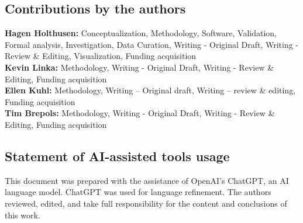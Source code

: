 \subsection{Contributions by the authors}
%
\textbf{Hagen Holthusen:} Conceptualization, Methodology, Software, Validation, Formal analysis, Investigation, Data Curation, Writing - Original Draft, Writing - Review \& Editing, Visualization, Funding acquisition\\
\textbf{Kevin Linka:} Methodology, Writing - Original Draft, Writing - Review \& Editing, Funding acquisition\\
\textbf{Ellen Kuhl:} Methodology, Writing – Original draft, Writing – review \& editing, Funding acquisition\\
\textbf{Tim Brepols:} Methodology, Writing - Original Draft, Writing - Review \& Editing, Funding acquisition\\
%
\subsection{Statement of AI-assisted tools usage}
%
This document was prepared with the assistance of OpenAI's ChatGPT, an AI language model. ChatGPT was used for language refinement. The authors reviewed, edited, and take full responsibility for the content and conclusions of this work.